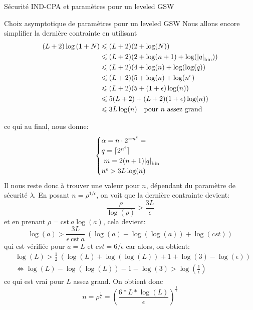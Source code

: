\begin{section}{Sécurité IND-CPA et paramètres pour un leveled GSW}
\begin{subsection}{Choix asymptotique de paramètres pour un leveled GSW}
Nous allons encore simplifier la dernière contrainte en utilisant
\begin{align*} (L+2) \log\left( 1 + N\right) &\leqslant (L+2) (2 + \log(N)) \\
&\leqslant (L+2) (2 + \log(n+1) +  \log({|q|}_{\text{bin}})) \\
&\leqslant (L+2) (4 + \log(n) + \log(\log(q)) \\
&\leqslant (L+2) (5 + \log(n) + \log(n^\epsilon) \\
&\leqslant (L+2) (5 + (1+\epsilon)\log(n)) \\
&\leqslant 5(L+2) + (L+2)(1+\epsilon)\log(n)) \\
&\leqslant 3 L \log(n) \quad \text{pour $n$ assez grand}
\end{align*}

ce qui au final, nous donne:
\[ \begin{cases}
	\alpha  = n \cdot 2^{-n^\epsilon}=  \\
	q = \lceil 2^{n^\epsilon} \rceil\\ 
	m = 2(n+1)\bnorm{q} \\  
	n^\epsilon > 3 L \log(n)
	\end{cases}  \]
Il nous reste donc à trouver une valeur pour $n$, dépendant du paramètre de sécurité $\lambda$.  En posant $n = \rho^{1/\epsilon}$, on voit que la dernière contrainte devient:
\[ \frac{\rho}{\log(\rho)} > \frac{3 L}{\epsilon}  \]
et en prenant $\rho = \text{cst}\: a \log(a)$, cela devient:
\[\log(a)> \frac{3 L}{\epsilon\:\text{cst}\: a}\:(\log(a) + \log(\log(a)) + \log(cst))   \]
qui est vérifiée pour $a = L$ et $cst = 6/\epsilon$ car alors, on obtient:
\begin{align*}
& \log(L)> \frac{1}{\text{2}}\:(\log(L) + \log(\log(L)) + 1 + \log(3) - \log(\epsilon)) \\
&\Leftrightarrow  \log(L) - \log(\log(L)) - 1 - \log(3) > \log(\frac{1}{\epsilon})
\end{align*}
ce qui est vrai pour $L$ assez grand.  
On obtient donc 
\[n = \rho^{\frac{1}{\epsilon}}  = {\left(\frac{6 * L * \log(L)}{\epsilon}\right)}^{\frac{1}{\epsilon}}\]


\end{subsection}
\end{section}
